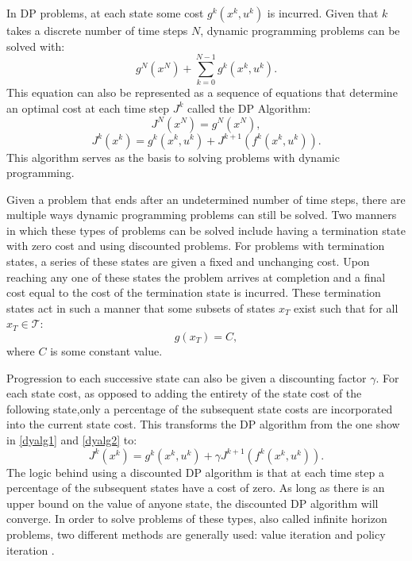 In DP problems, at each state some cost $g^k(x^k,u^k)$ is incurred. Given that $k$ takes a discrete number of time steps $N$, dynamic programming problems can be solved with:
\begin{equation}\label{dyprog}
g^{N}(x^N)+\sum_{k=0}^{N-1}g^k(x^k,u^k).
\end{equation}
This equation can also be represented as a sequence of equations that determine an optimal cost at each time step $J^k$ called the DP Algorithm:
\begin{equation}\label{dyalg1}
J^N(x^N)= g^N(x^N),
\end{equation}
\begin{equation}\label{dyalg2}
J^k(x^k)= g^k(x^k,u^k)+J^{k+1}(f^k(x^k,u^k)).
\end{equation}
This algorithm serves as the basis to solving problems with dynamic programming.

Given a problem that ends after an undetermined number of time steps, there are multiple ways dynamic programming problems can still be solved. Two manners in which these types of problems can be solved include having a termination state with zero cost and using discounted problems. For problems with termination states, a series of these states are given a fixed and unchanging cost. Upon reaching any one of these states the problem arrives at completion and a final cost equal to the cost of the termination state is incurred. These termination states act in such a manner that some subsets of states $x_T$ exist such that for all $x_T \in \mathscr{T}$:
\begin{equation}
g(x_T) = C,
\end{equation}
where $C$ is some constant value.

Progression to each successive state can also be given a discounting factor $\gamma$. For each state cost, as opposed to adding the entirety of the state cost of the following state,only a percentage of the subsequent state costs are incorporated into the current state cost. This transforms the DP algorithm from the one show in \ref{dyalg1} and \ref{dyalg2} to:
\begin{equation}\label{dyalgdis}
J^k(x^k)= g^k(x^k,u^k)+\gamma J^{k+1}(f^k(x^k,u^k)).
\end{equation}        
The logic behind using a discounted DP algorithm is that at each time step a percentage of the subsequent states have a cost of zero. As long as there is an upper bound on the value of anyone state, the discounted DP algorithm will converge. In order to solve problems of these types, also called infinite horizon problems, two different methods are generally used: value iteration and policy iteration \cite{bert}.  


